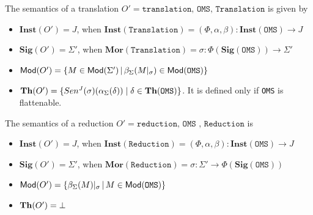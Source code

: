 \documentclass[10pt,fleqn,%
\ifpretendfinal
final%
\else
draft%
\fi,
]{scrreprt}
\newcommand*{\syntax}[1]{\texttt{#1}}
\newcommand{\Sig}{\mathbf{Sig}}
\newcommand{\Mor}{\mathbf{Mor}}
\newcommand{\Inst}{\ensuremath{\mathbf{Inst}}}
\begin{document}

The semantics of a translation $O'= \syntax{translation, OMS, Translation}$ is given by
\begin{itemize}
 \item $\Inst(O') = J$, when $\Inst(\syntax{Translation}) = (\Phi, \alpha, \beta) : \Inst(\syntax{OMS}) \to J$ 
 \item $\Sig(O') = \Sigma'$, when $\Mor(\syntax{Translation}) = \sigma:\Phi(\Sig(\syntax   {OMS}))\to \Sigma'$
 \item $\Mod(O') = \{M \in \Mod(\Sigma') \,|\, \beta_\Sigma(M\forget\sigma)\in \Mod(\syntax{OMS})\}$
 \item $\Th(O') = \{   Sen^J(\sigma)(\alpha_\Sigma(\delta))  \mid \delta \in \Th(\syntax{OMS}) \}$. It is defined only if \syntax{OMS} is flattenable.
\end{itemize}


The semantics of a reduction
$O' = \syntax{reduction, OMS , Reduction}$
is
\begin{itemize}

  \item $\Inst(O') = J$, when $\Inst(\syntax{Reduction})
  = (\Phi, \alpha, \beta) : \Inst(\syntax{OMS}) \to J$
  \item $\Sig(O') = \Sigma'$, when
   $\Mor(\syntax{Reduction}) = \sigma:\Sigma'\to
    \Phi(\Sig(\syntax{OMS}))$
  \item $\Mod(O') = \{\beta_\Sigma(M)\forget{\sigma} \,|\, M\in \Mod(\syntax{OMS})\}$
  \item $\mathbf{Th}(O') = \bot$

\end{itemize}

\end{document}
